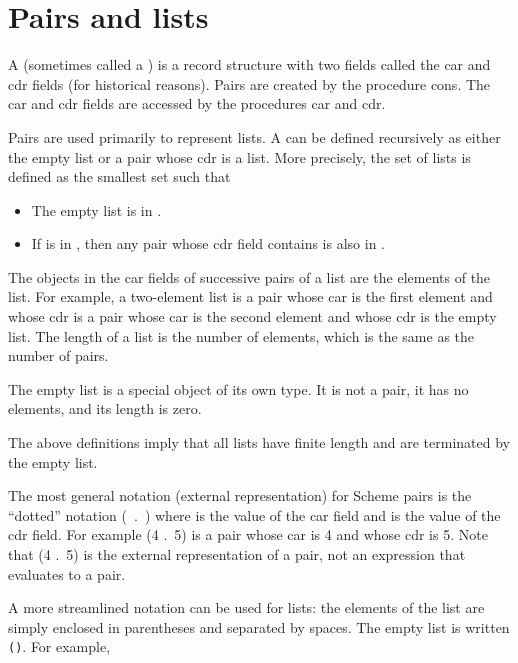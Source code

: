 \section{Pairs and lists}
\label{listsection}

A  (sometimes called a ) is a
record structure with two fields called the car and cdr fields (for
historical reasons).  Pairs are created by the procedure {\cf cons}.
The car and cdr fields are accessed by the procedures {\cf car} and
{\cf cdr}.

Pairs are used primarily to represent lists.  A  can
be defined recursively as either the empty list or a pair whose
cdr is a list.  More precisely, the set of lists is defined as the smallest
set  such that

\begin{itemize}
\item The empty list is in .
\item If  is in , then any pair whose cdr field contains
       is also in .
\end{itemize}

The objects in the car fields of successive pairs of a list are the
elements of the list.  For example, a two-element list is a pair whose car
is the first element and whose cdr is a pair whose car is the second element
and whose cdr is the empty list.  The length of a list is the number of
elements, which is the same as the number of pairs.

The empty list is a special object of its own type.
It is not a pair, it has no elements, and its length is zero.

\begin{note}
The above definitions imply that all lists have finite length and are
terminated by the empty list.
\end{note}

The most general notation (external representation) for Scheme pairs is
the ``dotted'' notation \hbox{\cf ( .\ )} where
 is the value of the car field and  is the value of the
cdr field.  For example {\cf (4 .\ 5)} is a pair whose car is 4 and whose
cdr is 5.  Note that {\cf (4 .\ 5)} is the external representation of a
pair, not an expression that evaluates to a pair.

A more streamlined notation can be used for lists: the elements of the
list are simply enclosed in parentheses and separated by spaces.  The
empty list is written {\tt()}.  For example,

